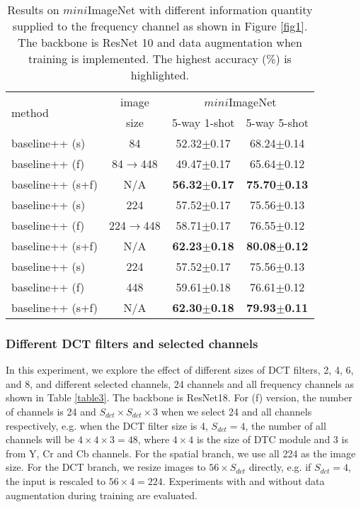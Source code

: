\documentclass[10pt, conference, compsocconf]{IEEEtran}
\begin{document}
\begin{table}[tp]
\centering
\caption{Results on $\textit{mini}$ImageNet with different information quantity supplied to the frequency channel as shown in Figure \ref{fig1}. The backbone is ResNet 10 and data augmentation when training is implemented. The highest accuracy (\%) is highlighted.}
\begin{tabular}{l|c|cc}
\toprule
\multirow{2}{*}{method} & image & 
\multicolumn{2}{c}{$\textit{mini}$ImageNet} \\
& size &5-way 1-shot& 5-way 5-shot\\ \hline
baseline++ (s) & 84 & 52.32$\pm$0.17 & 68.24$\pm$0.14 \\
baseline++ (f) & 84$\rightarrow$448 & 49.47$\pm$0.17 & 65.64$\pm$0.12 \\
baseline++ (s+f) & N/A & {}{\bf{56.32$\pm$0.17}} & {}{\bf{75.70$\pm$0.13}} \\\hline
baseline++ (s) & 224 & 57.52$\pm$0.17 & 75.56$\pm$0.13  \\
baseline++ (f) & 224$\rightarrow$448 & {}{58.71$\pm$0.17} & {}{76.55$\pm$0.12} \\
baseline++ (s+f) & N/A & {}{\bf{62.23$\pm$0.18}} & {}{\bf{80.08$\pm$0.12}} \\\hline
baseline++ (s) & 224 & 57.52$\pm$0.17 & 75.56$\pm$0.13  \\
baseline++ (f) & 448 & 59.61$\pm$0.18 & 76.61$\pm$0.12  \\
baseline++ (s+f) & N/A & {}{\bf{62.30$\pm$0.18}} & {}{\bf{79.93$\pm$0.11}} \\

\bottomrule
\end{tabular}
\label{table2}
\end{table}

\subsubsection{Different DCT filters and selected channels}
In this experiment, we explore the effect of different sizes of DCT filters, 2, 4, 6, and 8, and different selected channels, 24 channels and all frequency channels as shown in Table \ref{table3}. The backbone is ResNet18. For (f) version, the number of channels is 24 and $S_{dct}\times S_{dct}\times 3$ when we select 24 and all channels respectively, e.g. when the DCT filter size is 4, $S_{dct} = 4$, the number of all channels will be $4\times 4\times 3 = 48$, where $4\times 4$ is the size of DTC module and 3 is from Y, Cr and Cb channels. For the spatial branch, we use all 224 as the image size. For the DCT branch, we resize images to $56\times S_{dct}$ directly, e.g. if $S_{dct} = 4$, the input is rescaled to $56\times 4 = 224$. Experiments with and without data augmentation during training are evaluated.
\end{document}
